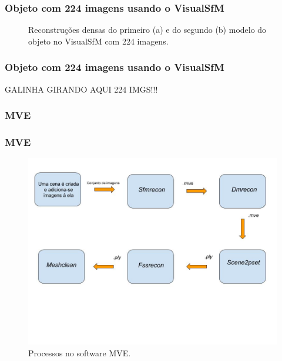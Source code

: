 \documentclass[table, usenames, svgnames, xcolor=dvipsnames]{beamer}
\begin{document}
\begin{frame}
\frametitle{\textbf{Objeto com 224 imagens usando o VisualSfM}}
	\begin{figure}[!h]
		\centering
		\caption{Reconstruções densas do primeiro (a) e do segundo (b) modelo do objeto no VisualSfM com 224 imagens.
		}
	\end{figure}
\end{frame}

\begin{frame}
\frametitle{\textbf{Objeto com 224 imagens usando o VisualSfM}}
	GALINHA GIRANDO AQUI 224 IMGS!!!
\end{frame}
\subsubsection{MVE}

\begin{frame}
\frametitle{\textbf{MVE}}
	\begin{figure}[!h]
		\centering
		\includegraphics[width=1\linewidth]{figs/pipelineMVE.jpg}
		\caption{%
			Processos no software MVE.
		}
	\end{figure}
\end{frame}
\end{document}
